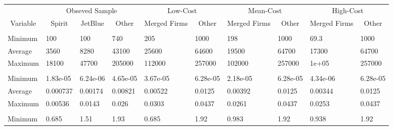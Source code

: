 
\begin{tabular}[t]{llllllllll}
\toprule
\multicolumn{1}{c}{ } & \multicolumn{3}{c}{Obseved Sample} & \multicolumn{2}{c}{Low-Cost} & \multicolumn{2}{c}{Mean-Cost} & \multicolumn{2}{c}{High-Cost} \\
\cmidrule(l{3pt}r{3pt}){2-4} \cmidrule(l{3pt}r{3pt}){5-6} \cmidrule(l{3pt}r{3pt}){7-8} \cmidrule(l{3pt}r{3pt}){9-10}
\multicolumn{1}{c}{Variable} & \multicolumn{1}{c}{Spirit} & \multicolumn{1}{c}{JetBlue} & \multicolumn{1}{c}{Other} & \multicolumn{1}{c}{Merged Firms} & \multicolumn{1}{c}{Other} & \multicolumn{1}{c}{Merged Firms} & \multicolumn{1}{c}{Other} & \multicolumn{1}{c}{Merged Firms} & \multicolumn{1}{c}{Other} \\
\cmidrule(l{3pt}r{3pt}){1-1} \cmidrule(l{3pt}r{3pt}){2-2} \cmidrule(l{3pt}r{3pt}){3-3} \cmidrule(l{3pt}r{3pt}){4-4} \cmidrule(l{3pt}r{3pt}){5-5} \cmidrule(l{3pt}r{3pt}){6-6} \cmidrule(l{3pt}r{3pt}){7-7} \cmidrule(l{3pt}r{3pt}){8-8} \cmidrule(l{3pt}r{3pt}){9-9} \cmidrule(l{3pt}r{3pt}){10-10}
\addlinespace[0.3em]
\multicolumn{10}{l}{\textbf{Passengers}}\\
\hspace{1em}Minimum & 100 & 100 & 740 & 205 & 1000 & 198 & 1000 & 69.3 & 1000\\
\hspace{1em}Average & 3560 & 8280 & 43100 & 25600 & 64600 & 19500 & 64700 & 17300 & 64700\\
\hspace{1em}Maximum & 18100 & 47700 & 205000 & 112000 & 257000 & 102000 & 257000 & 1e+05 & 257000\\
\addlinespace[0.3em]
\multicolumn{10}{l}{\textbf{Market Share}}\\
\hspace{1em}Minimum & 1.83e-05 & 6.24e-06 & 4.65e-05 & 3.67e-05 & 6.28e-05 & 2.18e-05 & 6.28e-05 & 4.34e-06 & 6.28e-05\\
\hspace{1em}Average & 0.000737 & 0.00174 & 0.00821 & 0.00522 & 0.0125 & 0.00392 & 0.0125 & 0.00344 & 0.0125\\
\hspace{1em}Maximum & 0.00536 & 0.0143 & 0.026 & 0.0303 & 0.0437 & 0.0261 & 0.0437 & 0.0253 & 0.0437\\
\addlinespace[0.3em]
\multicolumn{10}{l}{\textbf{Prices}}\\
\hspace{1em}Minimum & 0.685 & 1.51 & 1.93 & 0.685 & 1.92 & 0.983 & 1.92 & 0.938 & 1.92\\

\end{tabular}
